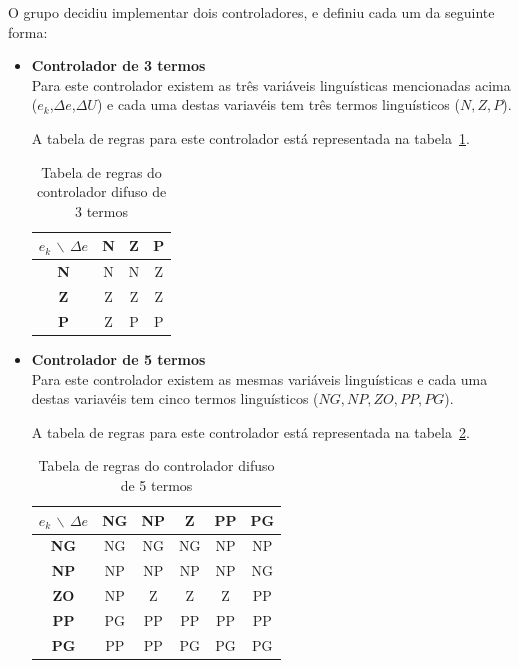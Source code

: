 \documentclass{article}
\begin{document}
O grupo decidiu implementar dois controladores, e definiu cada um da seguinte forma:
\begin{itemize}
\item \textbf{Controlador de 3 termos} \\
Para este controlador existem as três variáveis linguísticas mencionadas acima ($e_{k}$,$\Delta e$,$\Delta U$) e cada uma destas variavéis tem três termos linguísticos (${N,Z,P}$).

A tabela de regras para este controlador está representada na tabela~\ref{3_terms_fuzzy}.

\begin{table}[!h]
\centering
	\caption{Tabela de regras do controlador difuso de 3 termos}
	\label{3_terms_fuzzy}
	\begin{tabular}{|c|c|c|c|}
	\hline 
	$e_{k}$ $\backslash$ $\Delta e$ & \textbf{N} & \textbf{Z} & \textbf{P} \\ 
	\hline 
	\textbf{N} & N & N & Z \\ 
	\hline 
	\textbf{Z} & Z & Z & Z \\ 
	\hline 
	\textbf{P} & Z & P & P \\ 
	\hline 
	\end{tabular} 
\end{table}


\item \textbf{Controlador de 5 termos} \\
Para este controlador existem as mesmas variáveis linguísticas e cada uma destas variavéis tem cinco termos linguísticos (${NG,NP,ZO,PP,PG}$).

A tabela de regras para este controlador está representada na tabela~\ref{5_terms_fuzzy}.

\begin{table}[!h]
\centering
	\caption{Tabela de regras do controlador difuso de 5 termos}
	\label{5_terms_fuzzy}
	\begin{tabular}{|c|c|c|c|c|c|}
	\hline 
	$e_{k}$ $\backslash$ $\Delta e$ & \textbf{NG} & \textbf{NP} & \textbf{Z} & \textbf{PP} & \textbf{PG} \\ 
	\hline 
	\textbf{NG} & NG & NG & NG & NP & NP \\ 
	\hline 
	\textbf{NP} & NP & NP & NP & NP & NG \\ 
	\hline 
	\textbf{ZO} & NP & Z & Z & Z & PP \\ 
	\hline
	\textbf{PP} & PG & PP & PP & PP & PP \\ 
	\hline 
	\textbf{PG} & PP & PP & PG & PG & PG \\ 
	\hline 
	\end{tabular} 
\end{table}
\end{itemize}
\end{document}

